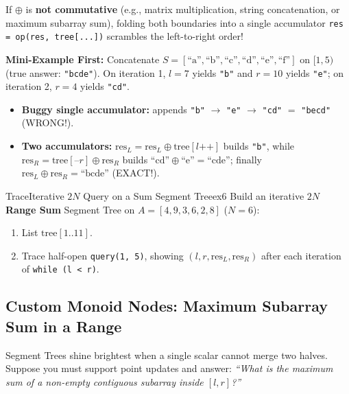 \documentclass[11pt,a4paper]{article}
\theoremstyle{definition}
\newcommand{\examplebeat}{\textbf{\color{primaryblue}Mini-Example First:} }
\begin{document}
\begin{watchoutbox}
If $\oplus$ is \textbf{not commutative} (e.g., matrix multiplication, string concatenation, or maximum subarray sum), folding both boundaries into a single accumulator \texttt{res = op(res, tree[...])} scrambles the left-to-right order!

\examplebeat Concatenate $S = [\text{``a''}, \text{``b''}, \text{``c''}, \text{``d''}, \text{``e''}, \text{``f''}]$ on $[1, 5)$ (true answer: \texttt{"bcde"}). On iteration 1, $l=7$ yields \texttt{"b"} and $r=10$ yields \texttt{"e"}; on iteration 2, $r=4$ yields \texttt{"cd"}.
\begin{itemize}[itemsep=1pt, topsep=1pt]
    \item \textbf{Buggy single accumulator:} appends \texttt{"b"} $\to$ \texttt{"e"} $\to$ \texttt{"cd"} $=$ \texttt{"becd"} (WRONG!).
    \item \textbf{Two accumulators:} $\text{res}_L = \text{res}_L \oplus \text{tree}[l\text{++}]$ builds \texttt{"b"}, while $\text{res}_R = \text{tree}[\text{--}r] \oplus \text{res}_R$ builds $\text{``cd''} \oplus \text{``e''} = \text{``cde''}$; finally $\text{res}_L \oplus \text{res}_R = \text{``bcde''}$ (EXACT!).
\end{itemize}
\end{watchoutbox}

\begin{tryitbox}{Trace}{Iterative $2N$ Query on a Sum Segment Tree}{ex6}
Build an iterative $2N$ \textbf{Range Sum} Segment Tree on $A = [4, 9, 3, 6, 2, 8]$ ($N = 6$):
\begin{enumerate}[itemsep=2pt, topsep=2pt]
    \item List $\text{tree}[1..11]$.
    \item Trace half-open \texttt{query(1, 5)}, showing $(l, r, \text{res}_L, \text{res}_R)$ after each iteration of \texttt{while (l < r)}.
\end{enumerate}
\end{tryitbox}

\subsection{Custom Monoid Nodes: Maximum Subarray Sum in a Range}

Segment Trees shine brightest when a single scalar cannot merge two halves. Suppose you must support point updates and answer: \emph{``What is the maximum sum of a non-empty contiguous subarray inside $[l, r]$?''}
\end{document}
